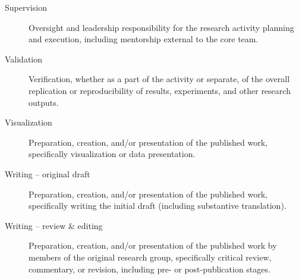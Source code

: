 \documentclass[%
 reprint,
nofootinbib,
 amsmath,amssymb,
 aps,
]{revtex4-2}
\begin{document}
\begin{description}
\item[Supervision]
Oversight and leadership responsibility for the research activity planning and execution, including mentorship external to the core team.

\item[Validation]
Verification, whether as a part of the activity or separate, of the overall replication or reproducibility of results, experiments, and other research outputs.

\item[Visualization]
Preparation, creation, and/or presentation of the published work, specifically visualization or data presentation.

\item[Writing -- original draft]
Preparation, creation, and/or presentation of the published work, specifically writing the initial draft (including substantive translation).

\item[Writing -- review \& editing]
Preparation, creation, and/or presentation of the published work by members of the original research group, specifically critical review, commentary, or revision, including pre- or post-publication stages.

\end{description}


% 


\end{document}
